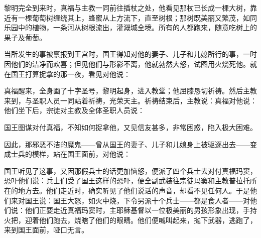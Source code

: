 黎明完全到来时，真福与主教一同前往插杖之处，他看见那杖已长成一棵大树，靠近有一棵葡萄树缠绕其上，蜂蜜从上方流下，直至树根；那树既美丽又繁茂，如同乐园中的植物，一条河从树根流出，灌溉城全境。所有的人都跑来，随意吃树上的果子及葡萄。\par

当所发生的事被禀报到王宫时，国王得知对他的妻子、儿子和儿媳所行的事，一时因他们的洁净而欢喜；但见他们与形影不离，他就勃然大怒，试图用火烧死他。就在国王打算捉拿的那一夜，看见对他说：\par

真福醒来，全身画了十字圣号，黎明起身，进入教堂；他屈膝恳切祈祷。然后主教来到，与圣职人员一同站着祈祷，光荣天主。祈祷结束后，主教说：真福对他说：他们坐下后，宗徒对主教及全体圣职人员说：\par

国王图谋对付真福，不知如何捉拿他，又见信友甚多，非常困惑，陷入极大困难。\par

因此，那邪恶不洁的魔鬼——曾从国王的妻子、儿子和儿媳身上被驱逐出去——变成士兵的模样，站在国王面前，对他说：\par

国王听见了这事，又因那假兵士的话更加恼怒，便派了四个兵士去对付真福玛窦，恐吓他们说：兵士们受了国王这样的恐吓，便全副武装往宗徒玛窦和主教普拉托所在的地方去。他们走近时，确实听见了他们说话的声音，却看不见任何人。于是他们来对国王说：国王大怒，如火中烧，下令另派十个兵士——都是食人者——对他们说：他们正要走近真福玛窦时，主耶稣基督以一位极美丽的男孩形象出现，手持火把，迎着他们跑去，烧瞎了他们的眼睛。他们便喊叫起来，抛下武器，逃跑了，来到国王面前，哑口无言。\par

